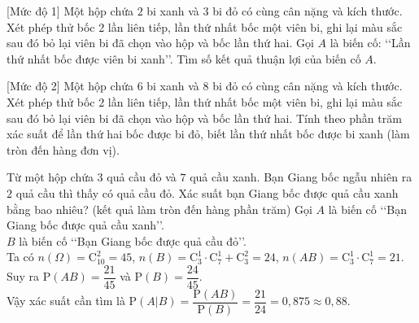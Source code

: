 \begin{bt}%
[Mức độ 1]%
	Một hộp chứa $2$ bi xanh và $3$ bi đỏ có cùng cân nặng và kích thước. Xét phép thử bốc 2 lần liên tiếp, lần thứ nhất bốc một viên bi, ghi lại màu sắc sau đó bỏ lại viên bi đã chọn vào hộp và bốc lần thứ hai. Gọi $A$ là biến cố: \lq\lq Lần thứ nhất bốc được viên bi xanh\rq\rq. Tìm số kết quả thuận lợi của biến cố $A$.
\end{bt}

\begin{bt}%
[Mức độ 2]%
	Một hộp chứa $6$ bi xanh và $8$ bi đỏ có cùng cân nặng và kích thước. Xét phép thử bốc 2 lần liên tiếp, lần thứ nhất bốc một viên bi, ghi lại màu sắc sau đó bỏ lại viên bi đã chọn vào hộp và bốc lần thứ hai. Tính theo phần trăm xác suất để lần thứ hai bốc được bi đỏ, biết lần thứ nhất bốc được bi xanh (làm tròn đến hàng đơn vị).
\end{bt}

\begin{bt}%
	Từ một hộp chứa $3$ quả cầu đỏ và $7$ quả cầu xanh. Bạn Giang bốc ngẫu nhiên ra $2$ quả cầu thì thấy có quả cầu đỏ. Xác suất bạn Giang bốc được quả cầu xanh bằng bao nhiêu? (kết quả làm tròn đến hàng phần trăm)
	\loigiai
	{
		Gọi $A$ là biến cố \lq\lq Bạn Giang bốc được quả cầu xanh\rq\rq.\\
		$B$ là biến cố \lq\lq Bạn Giang bốc được quả cầu đỏ\rq\rq.\\
		Ta có $n(\Omega)= \mathrm{C}_{10}^2=45$, $n(B)= \mathrm{C}_3^1 \cdot \mathrm{C}_7^1 + \mathrm{C}_3^2= 24$, $n(AB)= \mathrm{C}_3^1\cdot \mathrm{C}_7^1=21$.\\
		Suy ra $\mathrm{P}(AB)= \dfrac{21}{45}$ và $\mathrm{P}(B)= \dfrac{24}{45}$.\\
		Vậy xác suất cần tìm là $\mathrm{P}(A|B)= \dfrac{\mathrm{P}(AB)}{\mathrm{P}(B)}= \dfrac{21}{24}= 0{,}875 \approx 0{,}88$.
	}
\end{bt}

